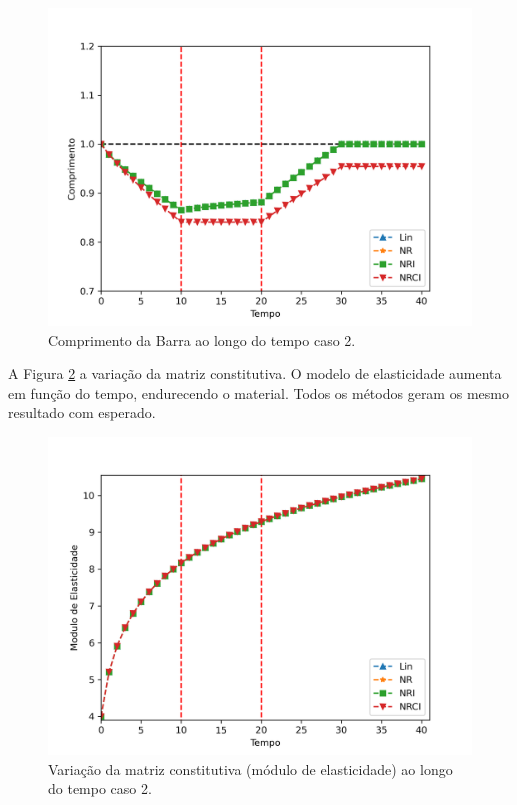 \documentclass[12pt,a4paper]{article}
\begin{document}
\begin{figure}[H]
	\centering
	\includegraphics[width=1.0\textwidth]{caso2/desloc_caso2.png}
	\caption{Comprimento da Barra ao longo do tempo caso 2.}
	\label{fig:u_caso2}
\end{figure}

A Figura \ref{fig:modE_caso2} a variação da matriz constitutiva. O modelo de elasticidade aumenta em função do tempo, endurecendo o material. Todos os métodos geram os mesmo resultado com esperado.

\begin{figure}[H]
	\centering
	\includegraphics[width=1.0\textwidth]{caso2/modE_caso2.png}
	\caption{Variação da matriz constitutiva (módulo de elasticidade) ao longo do tempo caso 2.}
	\label{fig:modE_caso2}
\end{figure}
\end{document}
